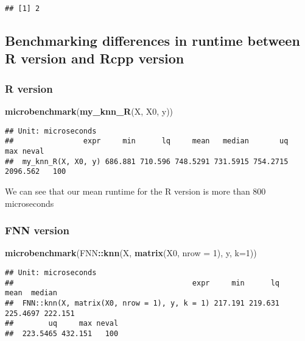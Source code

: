 \documentclass[]{article}
\newenvironment{Shaded}{\begin{snugshade}}{\end{snugshade}}
\newcommand{\DataTypeTok}[1]{\textcolor[rgb]{0.13,0.29,0.53}{#1}}
\newcommand{\DecValTok}[1]{\textcolor[rgb]{0.00,0.00,0.81}{#1}}
\newcommand{\KeywordTok}[1]{\textcolor[rgb]{0.13,0.29,0.53}{\textbf{#1}}}
\newcommand{\NormalTok}[1]{#1}
\newcommand{\OperatorTok}[1]{\textcolor[rgb]{0.81,0.36,0.00}{\textbf{#1}}}
\begin{document}
\begin{verbatim}
## [1] 2
\end{verbatim}

\hypertarget{benchmarking-differences-in-runtime-between-r-version-and-rcpp-version}{%
\subsection{Benchmarking differences in runtime between R version and
Rcpp
version}\label{benchmarking-differences-in-runtime-between-r-version-and-rcpp-version}}

\hypertarget{r-version}{%
\subsubsection{R version}\label{r-version}}

\begin{Shaded}
\begin{Highlighting}[]
\KeywordTok{microbenchmark}\NormalTok{(}\KeywordTok{my_knn_R}\NormalTok{(X, X0, y))}
\end{Highlighting}
\end{Shaded}

\begin{verbatim}
## Unit: microseconds
##                expr     min      lq     mean   median       uq      max neval
##  my_knn_R(X, X0, y) 686.881 710.596 748.5291 731.5915 754.2715 2096.562   100
\end{verbatim}

We can see that our mean runtime for the R version is more than 800
microseconds

\hypertarget{fnn-version}{%
\subsubsection{FNN version}\label{fnn-version}}

\begin{Shaded}
\begin{Highlighting}[]
\KeywordTok{microbenchmark}\NormalTok{(FNN}\OperatorTok{::}\KeywordTok{knn}\NormalTok{(X, }\KeywordTok{matrix}\NormalTok{(X0, }\DataTypeTok{nrow =} \DecValTok{1}\NormalTok{), y, }\DataTypeTok{k=}\DecValTok{1}\NormalTok{))}
\end{Highlighting}
\end{Shaded}

\begin{verbatim}
## Unit: microseconds
##                                         expr     min      lq     mean  median
##  FNN::knn(X, matrix(X0, nrow = 1), y, k = 1) 217.191 219.631 225.4697 222.151
##        uq     max neval
##  223.5465 432.151   100
\end{verbatim}
\end{document}
